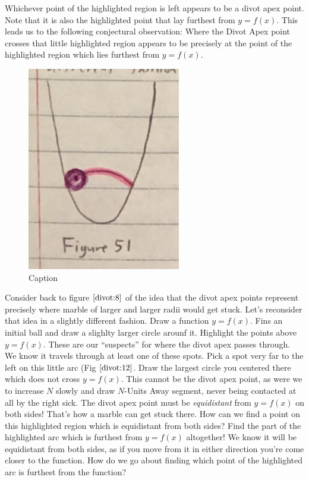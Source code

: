 Whichever point of the highlighted region is left appears to be a divot apex point. Note that it is also the highlighted point that lay furthest from $y = f(x)$. This leads us to the following conjectural observation: Where the Divot Apex point crosses that little highlighted region appears to be precisely at the point of the highlighted region which lies furthest from $y = f(x)$.

\renewcommand\w{0.25\textwidth}
\renewcommand\fw{0.9\linewidth}

\begin{figure}
  \label{divot:12}
  \includegraphics[width=\fw]{img/12-divot/12.png}
  \caption{Caption}
\end{figure}

Consider back to figure $\ref{divot:8}$ of the idea that the divot apex points represent precisely where marble of larger and larger radii would get stuck. Let's reconsider that idea in a slightly different fashion. Draw a function $y = f(x)$. Fins an initial ball and draw a slighlty larger circle arounf it. Highlight the points above $y = f(x)$. These are our ``suspects'' for where the divot apex passes through. We know it travels through at least one of these spots. Pick a spot very far to the left on this little arc (Fig $\ref{divot:12}$. Draw the largest circle you centered there which does not cross $y = f(x)$. This cannot be the divot apex point, as were we to increase $N$ slowly and draw $N$-Units Away segment, never being contacted at all by the right sick. The divot apex point must be \textit{equidistant} from $y = f(x)$ on both sides! That's how a marble can get stuck there. How can we find a point on this highlighted region which is equidistant from both sides? Find the part of the highlighted arc which is furthest from $y = f(x)$ altogether! We know it will be equidistant from both sides, as if you move from it in either direction you're come closer to the function. How do we go about finding which point of the highlighted arc is furthest from the function?

